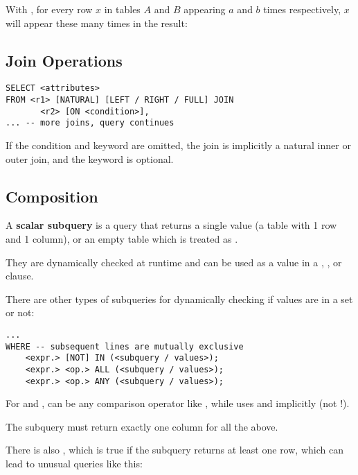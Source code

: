 With , for every row $x$ in tables $A$ and $B$ appearing $a$ and $b$ times respectively,
$x$ will appear these many times in the result:
\begin{itemize}
\end{itemize}

\subsection{Join Operations}
\begin{lstlisting}
SELECT <attributes>
FROM <r1> [NATURAL] [LEFT / RIGHT / FULL] JOIN
       <r2> [ON <condition>],
... -- more joins, query continues
\end{lstlisting}

If the condition and  keyword are omitted, the join is implicitly a natural inner or outer join,
and the  keyword is optional.

\subsection{Composition}
A \textbf{scalar subquery} is a query that returns a single value (a table with 1 row and 1 column),
or an empty table which is treated as .

They are dynamically checked at runtime and can be used as a value in a , ,
or  clause.

There are other types of subqueries for dynamically checking if values are in a set or not:
\begin{lstlisting}
...
WHERE -- subsequent lines are mutually exclusive
    <expr.> [NOT] IN (<subquery / values>);
    <expr.> <op.> ALL (<subquery / values>);
    <expr.> <op.> ANY (<subquery / values>);
\end{lstlisting}

For  and ,  can be any comparison operator like \code{=, <, >, <=, >=, <>},
while  uses \code{=} and \code{<>} implicitly (not !).

The subquery must return exactly one column for all the above.

There is also , which is true if the subquery returns at least one row, which can lead to unusual queries like this:

